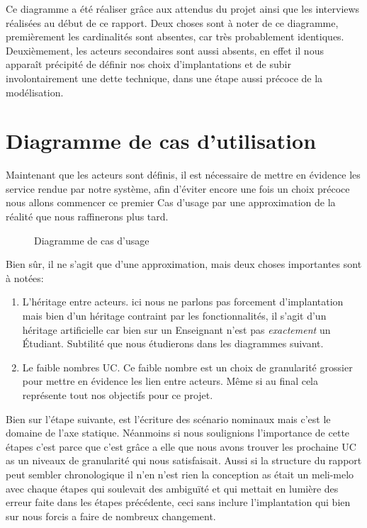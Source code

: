 \documentclass[a4paper,french,final]{memoir}
\begin{document}
Ce diagramme a été réaliser grâce aux attendus du projet ainsi que les interviews réalisées au début de ce rapport.
Deux choses sont à noter de ce diagramme, premièrement les cardinalités sont absentes, car très probablement identiques.
Deuxièmement, les acteurs secondaires sont aussi absents, en effet il nous apparaît précipité de définir nos choix d'implantations et de subir involontairement une dette technique, dans une étape aussi précoce de la modélisation.

\section{Diagramme de cas d’utilisation}
Maintenant que les acteurs sont définis, il est nécessaire de mettre en évidence les
service rendue par notre système, afin d'éviter encore une fois un choix précoce nous 
allons commencer ce premier Cas d'usage par une approximation de la réalité que nous
raffinerons plus tard.
\begin{figure}
    \centering
    
    \caption{Diagramme de cas d'usage}
    \label{fig:my_label}
\end{figure}


Bien sûr, il ne s'agit que d'une approximation, mais deux choses importantes sont à notées:
\begin{enumerate}
    \item L'héritage entre acteurs. ici nous ne parlons pas forcement d'implantation mais
    bien d'un héritage contraint par les fonctionnalités, il s'agit d'un héritage artificielle car bien sur un Enseignant n'est pas \emph{exactement} un Étudiant. Subtilité
    que nous étudierons dans les diagrammes suivant.
    \item Le faible nombres UC. Ce faible nombre est un choix de granularité grossier
    pour mettre en évidence les lien entre acteurs. Même si au final cela représente
    tout nos objectifs pour ce projet.
\end{enumerate}

Bien sur l'étape suivante, est l'écriture des scénario nominaux mais c'est le domaine
de l'axe statique. Néanmoins si nous soulignions l'importance de cette étapes c'est parce que c'est grâce a elle que nous avons trouver les prochaine UC as un niveaux de granularité
qui nous satisfaisait. Aussi si la structure du rapport peut sembler chronologique il n'en n'est rien la conception as était un meli-melo avec chaque étapes qui soulevait des ambiguïté et qui mettait en lumière des erreur faite dans les étapes précédente, ceci sans
inclure l'implantation qui bien sur nous forcis a faire de nombreux changement.
\end{document}
